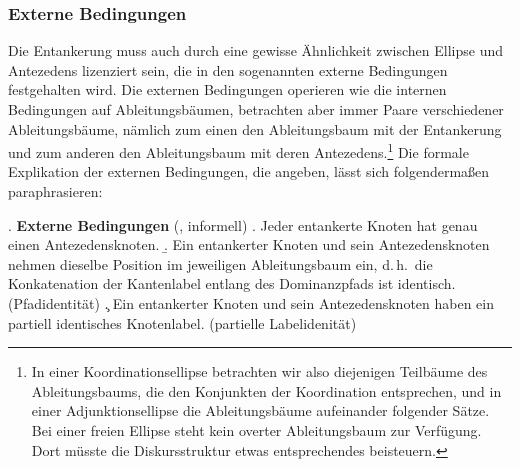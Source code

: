 \subsubsection*{Externe Bedingungen}  \label{sec-deanchoring-extern}

Die Entankerung muss auch durch eine gewisse Ähnlichkeit zwischen Ellipse und Antezedens lizenziert sein, die in den sogenannten externe Bedingungen festgehalten wird. Die externen Bedingungen operieren wie die internen Bedingungen auf Ableitungsbäumen, betrachten aber immer Paare verschiedener Ableitungsbäume, nämlich zum einen den Ableitungsbaum mit der Entankerung und zum anderen den Ableitungsbaum mit deren Antezedens.\footnote{In einer Koordinationsellipse betrachten wir also diejenigen Teilbäume des Ableitungsbaums, die den Konjunkten der Koordination entsprechen, und in einer Adjunktionsellipse die Ableitungsbäume aufeinander folgender Sätze. Bei einer freien Ellipse steht kein overter Ableitungsbaum zur Verfügung. Dort müsste die Diskursstruktur etwas entsprechendes beisteuern.} Die formale Explikation der externen Bedingungen, die \cite{Lichte:Kallmeyer:10} angeben, lässt sich folgenderma\ss en paraphrasieren:

\ex. {\bf Externe Bedingungen} (\citealt{Lichte:Kallmeyer:10}, informell) \label{ex-entankerung-externe-bedingungen}
\a. Jeder entankerte Knoten hat genau einen Antezedensknoten.
\b. Ein entankerter Knoten und sein Antezedensknoten nehmen dieselbe Position im jeweiligen Ableitungsbaum ein, d.\,h.\ die Konkatenation der Kantenlabel entlang des Dominanzpfads ist identisch. (Pfadidentität)
\c. Ein entankerter Knoten und sein Antezedensknoten haben ein partiell identisches Knotenlabel. (partielle Labelidenität)    

